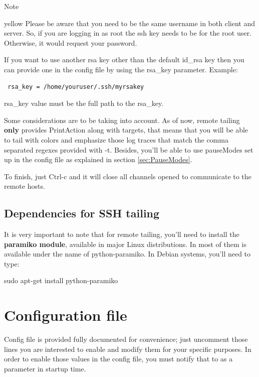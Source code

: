 \begin {bclogo}[logo =\bcinfo, barre = none,noborder = true]{Note}
\begin {gbar}{yellow}
Please be aware that you need to be the same username
in both client and server. So, if you are logging in as root the ssh key needs
to be for the root user. Otherwise, it would request your password.
\end{gbar}
\end{bclogo}
If you want to use another rsa key other than the default
id\_rsa key then you can provide one in the config file by using the rsa\_key
parameter. Example:

\begin{config}
\begin{verbatim}
 rsa_key = /home/youruser/.ssh/myrsakey
\end{verbatim} 
\end{config}

\noindent
rsa\_key value must be the full path to the rsa\_key.

Some considerations are to be taking into account. As of now, remote tailing
\textbf{only} provides PrintAction along with targets, that means that you will
be able to tail with colors and emphasize those log traces that match the comma
separated regexes provided with -t. Besides, you'll be able to use pauseModes
set up in the config file as explained in section \ref{sec:PauseModes}.

To finish, just Ctrl-c and it will close all channels opened to communicate to
the remote hosts. 

\subsection{Dependencies for SSH tailing}
It is very important to note that for remote tailing, you'll need to install
the \textbf{paramiko module}, available in major Linux distributions. In most
of them is available under the name of python-paramiko. In Debian systems,
you'll need to type:
\begin{cmd}
 sudo apt-get install python-paramiko
\end{cmd}

\section{Configuration file}
Config file is provided fully documented for convenience; just uncomment those
lines you are interested to enable and modify them for your specific purposes.
In order to enable those values in the config file, you must notify that to
\logftailer{} as a parameter in startup time.

